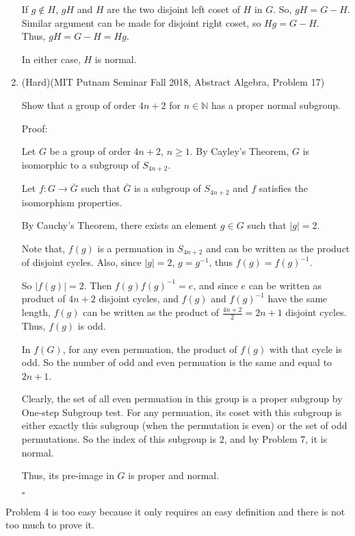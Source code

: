 \documentclass[12pt]{article}
\begin{document}
\begin{enumerate}
        If $g \not \in H$, $gH$ and $H$ are the two disjoint left coset of $H$ in $G$. So, $gH = G - H$. Similar argument can be made for disjoint right coset, so $Hg = G - H$. \\Thus, $gH = G - H = Hg$. 

        In either case, $H$ is normal.
        \pagebreak

    \item (Hard)(MIT Putnam Seminar Fall 2018, Abstract Algebra, Problem 17) 
        
        Show that a group of order $4n+2$ for $n \in \mathbb{N}$ has a proper normal subgroup. 
    
        Proof:

        Let $G$ be a group of order $4n+2$, $n \geq 1$. By Cayley's Theorem, $G$ is isomorphic to a subgroup of $S_{4n+2}$.

        Let $f: G \to \bar G$ such that $\bar G$ is a subgroup of $S_{4n+2}$ and $f$ satisfies the isomorphism properties.

        By Cauchy's Theorem, there exists an element $g \in G$ such that $|g| = 2$.

        Note that, $f(g)$ is a permuation in $S_{4n+2}$ and can be written as the product of disjoint cycles. Also, since $|g| = 2$, $g = g^{-1}$, thus $f(g) = f(g)^{-1}$.

        So $|f(g)| = 2$. Then $f(g)f(g)^{-1} = e$, and since $e$ can be written as product of $4n+2$ disjoint cycles, and $f(g)$ and $f(g)^{-1}$ have the same length, $f(g)$ can be written as the product of $\frac{4n+2}{2} = 2n+1$ disjoint cycles. Thus, $f(g)$ is odd. 

        In $f(G)$, for any even permuation, the product of $f(g)$ with that cycle is odd. So the number of odd and even permuation is the same and equal to $2n+1$. 

        Clearly, the set of all even permuation in this group is a proper subgroup by One-step Subgroup test. For any permuation, its coset with this subgroup is either exactly this subgroup (when the permutation is even) or the set of odd permutations. So the index of this subgroup is $2$, and by Problem 7, it is normal.

        Thus, its pre-image in $G$ is proper and normal.
        
        $\square$
        \pagebreak

\end{enumerate}

    Problem 4 is too easy because it only requires an easy definition and there is not too much to prove it.
\end{document}
